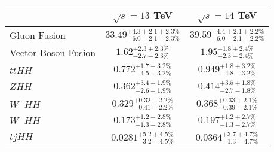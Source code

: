 \begin{table}[h!]
\renewcommand{\arraystretch}{1.5}
\begin{center}
    \begin{tabular}{l c c}
        \hline
        \hline
         & $\sqrt s = 13 $ TeV & $\sqrt s = 14 $ TeV \\
         \hline
         Gluon Fusion & 
$   33.49 ^{+4.3 +2.1 +2.3\%}_{-6.0 -2.1 -2.3\%} $ & $   39.59^{+4.4 +2.1 +2.2\%}_{-6.0 -2.1 -2.2\%} $ \\
         Vector Boson Fusion  & 
$ 1.62 ^{+2.3+2.3\%}_{-2.7 -2.3\%} $ & $ 1.95 ^{+1.8+2.4\%}_{-2.3 -2.4\%} $\\ 
$ t\bar t HH $ & 
$ 0.772 ^{+1.7 +3.2\%}_{-4.5 -3.2\%} $ & $ 0.949 ^{+1.8 +3.2\%}_{-4.8 -3.2\%} $\\
$ ZHH $ & 
$ 0.362 ^{+3.4 +1.9\%}_{-2.6 -1.9\%} $ & $ 0.414 ^{+3.5 +1.8\%}_{-2.7 -1.8\%} $ \\
$ W^+ HH $ & 
$ 0.329 ^{+0.32 +2.2\%}_{-0.41 -2.2\%} $ & $ 0.368 ^{+0.33 +2.1\%}_{-0.39 -2.1\%} $ \\
$ W^-HH $ & 
$  0.173 ^{+1.2 +2.8\%}_{-1.3 -2.8\%} $ & $  0.197 ^{+1.2 +2.7\%}_{-1.3 -2.7\%} $ \\
$ tjHH $ & 
$ 0.0281 ^{+5.2 +4.5\%}_{-3.2 -4.5\%} $ & $ 0.0364 ^{+3.7 +4.7\%}_{-1.3 -4.7\%} $ \\
\hline
\hline
\end{tabular}


\end{center}
\end{table}
